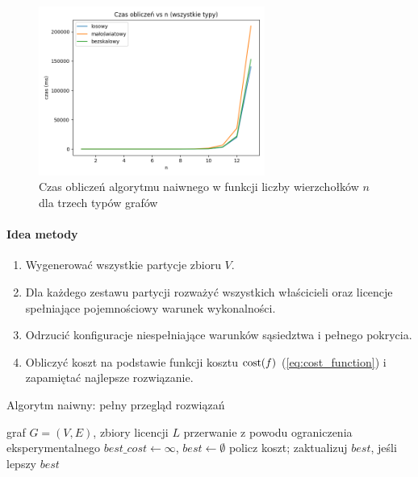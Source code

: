 \begin{figure}[H]
  \centering
  \includegraphics[width=0.66\textwidth]{assets/all_types_plot.png}
  \caption{Czas obliczeń algorytmu naiwnego w funkcji liczby wierzchołków $n$ dla trzech typów grafów}
  \label{fig:all_types_time}
\end{figure}

\paragraph{Idea metody}
\begin{enumerate}
  \item Wygenerować wszystkie partycje zbioru \(V\).
  \item Dla każdego zestawu partycji rozważyć wszystkich właścicieli oraz licencje spełniające pojemnościowy warunek wykonalności.
  \item Odrzucić konfiguracje niespełniające warunków sąsiedztwa i pełnego pokrycia.
  \item Obliczyć koszt na podstawie funkcji kosztu $\operatorname{cost}(f)$ (\ref{eq:cost_function}) i zapamiętać najlepsze rozwiązanie.
\end{enumerate}

\begin{algorithm}[H]
  \caption{Algorytm naiwny: pełny przegląd rozwiązań}
  \label{alg:naive}
  \begin{algorithmic}[1]
    \Require graf \(G=(V,E)\), zbiory licencji \( L\)
     \State \Return przerwanie z powodu ograniczenia eksperymentalnego \EndIf
    \State \(best\_cost \gets \infty\), \(best \gets \emptyset\)
    \State policz koszt; zaktualizuj \(best\), jeśli lepszy
    \EndIf
    \EndFor
    \EndFor
    \State \Return \(best\)
  \end{algorithmic}
\end{algorithm}

